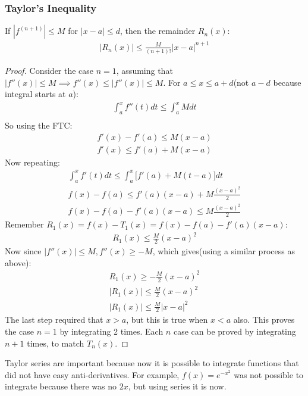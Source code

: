 \documentclass{article}
\begin{document}
\subsubsection{Taylor's Inequality}
If $|f^{(n+1)}| \leqslant M$ for $|x-a| \leqslant d$, then the remainder $R_n(x)$:
\begin{gather*}
    |R_n(x)| \leqslant \frac{M}{(n+1)!}|x-a|^{n+1}
\end{gather*}
\begin{proof}
Consider the case $n = 1$, assuming that $|f''(x)|\leqslant M \implies f''(x) \leqslant |f''(x)| \leqslant M$. For $a \leqslant x \leqslant a+d$(not $a-d$ because integral starts at $a$):
\begin{gather*}
    \int_a^x f''(t) dt \leqslant \int_a^x M dt\\
\end{gather*}
So using the FTC:
\begin{gather*}
    f'(x) - f'(a) \leqslant M(x-a)\\
    f'(x) \leqslant f'(a) + M(x-a)
\end{gather*}
Now repeating:
\begin{gather*}
    \int_a^x f'(t) dt \leqslant \int_a^x \big[f'(a) + M(t-a)\big] dt\\
    f(x) - f(a) \leqslant f'(a)(x-a) + M\frac{(x-a)^2}{2}\\
    f(x) - f(a) - f'(a)(x-a) \leqslant M\frac{(x-a)^2}{2}
\end{gather*}
Remember $R_1(x) = f(x) - T_1(x) = f(x) - f(a) - f'(a)(x-a)$:
\begin{gather*}
    R_1(x) \leqslant \frac{M}{2}(x-a)^2
\end{gather*}
Now since $|f''(x)| \leqslant M, f''(x) \geqslant -M$, which gives(using a similar process as above):
\begin{gather*}
    R_1(x) \geqslant -\frac{M}{2}(x-a)^2\\
    |R_1(x)| \leqslant \frac{M}{2}(x-a)^2\\
    |R_1(x)| \leqslant \frac{M}{2}|x-a|^2
\end{gather*}
The last step required that $x > a$, but this is true when $x < a$ also. This proves the case $n = 1$ by integrating 2 times. Each $n$ case can be proved by integrating $n + 1$ times, to match $T_n(x)$.
\end{proof}
Taylor series are important because now it is possible to integrate functions that did not have easy anti-derivatives. For example, $f(x) = e^{-x^2}$ was not possible to integrate because there was no $2x$, but using series it is now.
\end{document}
